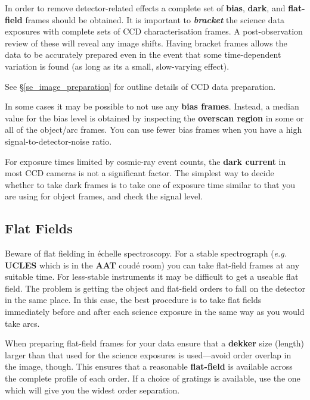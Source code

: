 \documentclass[twoside,11pt]{article}
\newcommand{\htmlref}[2]{#1}
\newcommand{\xlabel}[1]{}
\newcommand{\sgspec}[2]{#1}
\newcommand{\sgspec}[2]{#2}
\begin{document}
In order to remove detector-related effects a complete set of
\htmlref{{\bf bias}}{gl_bias_frame}, \htmlref{{\bf dark}}{gl_dark_frame},
and
\htmlref{{\bf flat-field}}{gl_flat_field} frames should be obtained.
It is important to {\em
\htmlref{{\bf bracket}}{gl_bracketing}} the science data exposures with
complete sets of CCD
characterisation frames.  A post-observation review of these will reveal
any image shifts.  Having bracket frames allows the data to be
accurately prepared even in the event that some time-dependent variation
is found (as long as its a small, slow-varying effect).

See \sgspec{\S \ref{se_image_preparation}}
{\htmlref{{\sl Image Preparation}}{se_image_preparation}}
for outline details of CCD data preparation.

In some cases it may be possible to not use any
\htmlref{{\bf bias frames}}{gl_bias_frame}.  Instead,
a median value for the bias level is obtained by inspecting the
\htmlref{{\bf overscan region}}{gl_overscan} in some or all of the object/arc
frames.
You can use fewer bias frames when you have a high signal-to-detector-noise
ratio.

For exposure times limited by cosmic-ray event counts, the
\htmlref{{\bf dark current}}{gl_dark_current}
in most CCD cameras is not a significant factor.  The simplest way to
decide whether to take dark frames is to take one of exposure time
similar to that you are using for object frames, and check the signal level.


\subsection{\label{se_flat_beware}\xlabel{flat_beware}Flat Fields}

Beware of flat fielding in \'{e}chelle spectroscopy.  For a stable
spectrograph ({\em{e.g.}} \htmlref{{\bf UCLES}}{gl_ucles} which is in the
\htmlref{{\bf AAT}}{gl_aao_aat} coud\'{e} room)
you can take flat-field frames at any suitable time.  For less-stable
instruments it may be difficult to get a useable flat field.
The problem is getting the object and flat-field orders to fall on the
detector in the same place.
In this case, the best procedure is to take flat fields immediately
before and after each science exposure in the same way as you would
take arcs.

When preparing flat-field frames for your data ensure that a
\htmlref{{\bf dekker}}{gl_dekker} size (length)
larger than that used for the science exposures is used\sgspec{---}{ - }avoid
order overlap in the image, though.  This ensures that a reasonable
\htmlref{{\bf flat-field}}{gl_flat_field} is available across the complete
profile of each order.  If a choice of gratings is available, use the
one which will give you the widest order separation.
\end{document}
